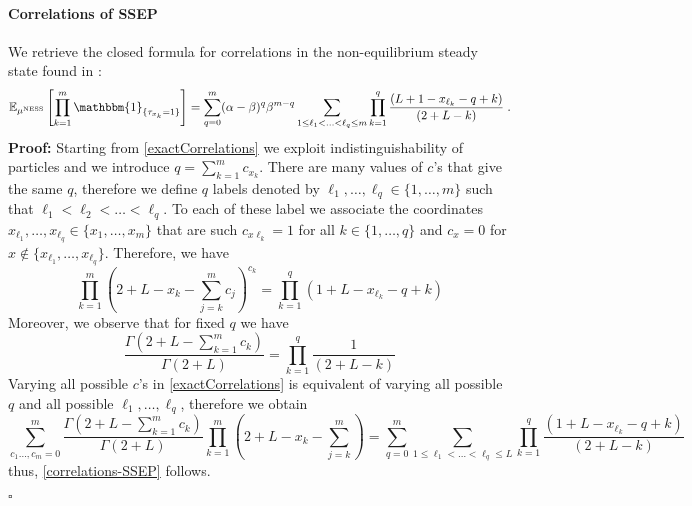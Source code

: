 \documentclass[10pt]{article}
\numberwithin{equation}{section}
\numberwithin{equation}{subsection}
\newcommand{\dt}{\;.}
\begin{document}
\paragraph{Correlations of SSEP}
We retrieve the closed formula for correlations in the non-equilibrium steady state found in \cite[(4.26)]{frassek2020eigenstates}:  
\begin{equation}\label{correlations-SSEP}
	\mathbb{E}_{\mu^{\text{NESS}}}\left[\prod_{k=1}^{m}\mathbbm{1}_{\{\tau_{x_{k}}=1\}}\right]=\sum_{q=0}^{m}(\alpha-\beta)^{q}\beta^{m-q}\sum_{1\leq \ell_{1}<\ldots<\ell_{q}\leq m}\prod_{k=1}^{q}\frac{\left(L+1-x_{\ell_{k}}-q+k\right)}{(2+L-k)}\dt
\end{equation} 
\textbf{Proof:} Starting from \eqref{exactCorrelations} we exploit indistinguishability of particles and we introduce $q=\sum_{k=1}^{m}c_{x_{k}}$. There are many values of $c$'s that give the same $q$, therefore we define $q$ labels denoted by $\ell_{1},\ldots,\ell_{q}\in \{1,\ldots,m\}$ such that  $\ell_{1}<\ell_{2}<\ldots<\ell_{q}$. To each of these label we associate the coordinates $x_{\ell_{1}},\ldots,x_{\ell_{q}}\in\{x_{1},\dots,x_{m}\}$ that are such $c_{x{\ell_{k}}}=1$ for all $k\in \{1,\ldots,q\}$ and $c_{x}=0$ for $x\notin \{x_{\ell_{1}},\ldots,x_{\ell_{q}}\}$. Therefore, we have 
	\begin{equation}
		\prod_{k=1}^{m}\left(2+L-x_{k}-\sum_{j=k}^{m}c_{j}\right)^{c_{k}}=\prod_{k=1}^{q}\left(1+L-x_{\ell_{k}}-q+k\right)
	\end{equation}
Moreover, we observe that for fixed $q$ we have
\begin{equation}\label{Gamma-product}
	\frac{\Gamma(2+L-\sum_{k=1}^{m}c_{k})}{\Gamma(2+L)}=\prod_{k=1}^{q}\frac{1}{(2+L-k)}
\end{equation}
Varying all possible $c$'s in \eqref{exactCorrelations} is equivalent of varying all possible $q$ and all possible $\ell_{1},\ldots,\ell_{q}$, therefore we obtain 
\begin{equation}
	\sum_{c_{1}\ldots,c_{m}=0}^{m}\frac{\Gamma(2+L-\sum_{k=1}^{m}c_{k})}{\Gamma(2+L)}\prod_{k=1}^{m}\left(2+L-x_{k}-\sum_{j=k}^{m}\right)=\sum_{q=0}^{m}\sum_{1\leq \ell_{1}<\ldots<\ell_{q}\leq L}\prod_{k=1}^{q}\frac{(1+L-x_{\ell_{k}}-q+k)}{(2+L-k)}
\end{equation}
thus, \eqref{correlations-SSEP} follows. 
\begin{flushright}
	$\square$
\end{flushright}
\end{document}
